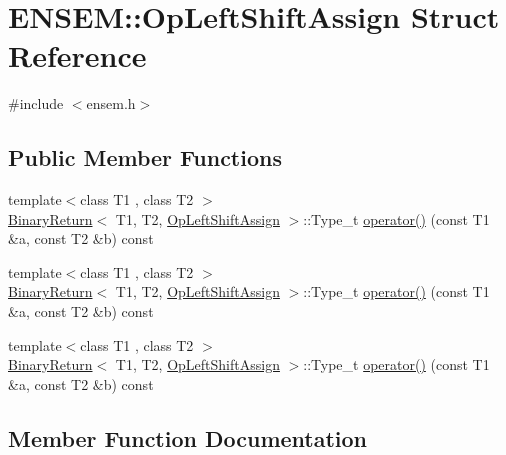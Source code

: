 \hypertarget{structENSEM_1_1OpLeftShiftAssign}{}\section{E\+N\+S\+EM\+:\+:Op\+Left\+Shift\+Assign Struct Reference}
\label{structENSEM_1_1OpLeftShiftAssign}


{\ttfamily \#include $<$ensem.\+h$>$}

\subsection*{Public Member Functions}
\begin{DoxyCompactItemize}
\item 
{\footnotesize template$<$class T1 , class T2 $>$ }\\\mbox{\hyperlink{structENSEM_1_1BinaryReturn}{Binary\+Return}}$<$ T1, T2, \mbox{\hyperlink{structENSEM_1_1OpLeftShiftAssign}{Op\+Left\+Shift\+Assign}} $>$\+::Type\+\_\+t \mbox{\hyperlink{structENSEM_1_1OpLeftShiftAssign_a777be5cb8e7641c4a6b448b0ccf1b745}{operator()}} (const T1 \&a, const T2 \&b) const
\item 
{\footnotesize template$<$class T1 , class T2 $>$ }\\\mbox{\hyperlink{structENSEM_1_1BinaryReturn}{Binary\+Return}}$<$ T1, T2, \mbox{\hyperlink{structENSEM_1_1OpLeftShiftAssign}{Op\+Left\+Shift\+Assign}} $>$\+::Type\+\_\+t \mbox{\hyperlink{structENSEM_1_1OpLeftShiftAssign_a777be5cb8e7641c4a6b448b0ccf1b745}{operator()}} (const T1 \&a, const T2 \&b) const
\item 
{\footnotesize template$<$class T1 , class T2 $>$ }\\\mbox{\hyperlink{structENSEM_1_1BinaryReturn}{Binary\+Return}}$<$ T1, T2, \mbox{\hyperlink{structENSEM_1_1OpLeftShiftAssign}{Op\+Left\+Shift\+Assign}} $>$\+::Type\+\_\+t \mbox{\hyperlink{structENSEM_1_1OpLeftShiftAssign_a777be5cb8e7641c4a6b448b0ccf1b745}{operator()}} (const T1 \&a, const T2 \&b) const
\end{DoxyCompactItemize}


\subsection{Member Function Documentation}
\mbox{\label{structENSEM_1_1OpLeftShiftAssign_a777be5cb8e7641c4a6b448b0ccf1b745}} 

